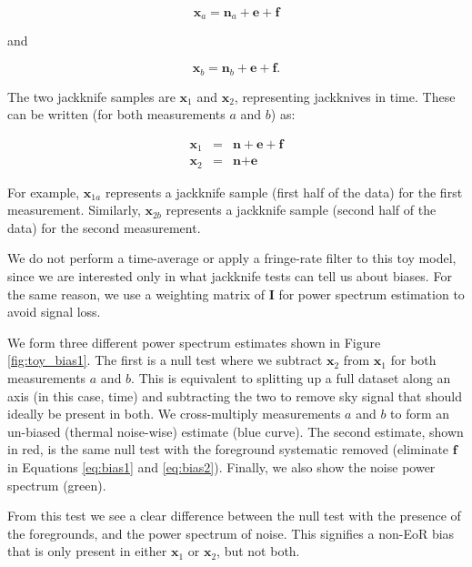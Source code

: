 \documentclass[preprint2,numberedappendix,tighten]{aastex6}  %
\begin{document}
\begin{equation}
\label{eq:bias1}
\textbf{x}_{a} = \textbf{n}_{a} + \textbf{e} + \textbf{f}
\end{equation} 

\noindent and 

\begin{equation}
\label{eq:bias2}
\textbf{x}_{b} = \textbf{n}_{b} + \textbf{e} + \textbf{f}.
\end{equation}

\noindent The two jackknife samples are $\textbf{x}_{1}$ and $\textbf{x}_{2}$, representing jackknives in time. These can be 
written (for both measurements $a$ and $b$) as:

\begin{eqnarray}
\textbf{x}_{1} &=& \textbf{n} + \textbf{e} + \textbf{f} \\
\textbf{x}_{2} &=& \textbf{n} + \textbf{e} 
\end{eqnarray}

\noindent For example, $\textbf{x}_{1a}$ represents a jackknife sample (first half of the data) for the first measurement. 
Similarly, $\textbf{x}_{2b}$ represents a jackknife sample (second half of the data) for the second measurement.

We do not perform a time-average or apply a fringe-rate filter to this toy model, since we are interested only in what jackknife 
tests can tell us about biases. For the same reason, we use a weighting matrix of $\textbf{I}$ for power spectrum estimation to 
avoid signal loss. 

We form three different power spectrum estimates shown in Figure \ref{fig:toy_bias1}. The first is a null test where we subtract $
\textbf{x}_{2}$ from $\textbf{x}_{1}$ for both measurements $a$ and $b$. This is equivalent to splitting up a full dataset along 
an axis (in this case, time) and subtracting the two to remove sky signal that should ideally be present in both. We cross-multiply measurements $a$ and $b$ to form an un-biased (thermal noise-wise) estimate (blue curve). The second estimate, 
shown in red, is the same null test with the foreground systematic removed (eliminate $\textbf{f}$ in Equations \ref{eq:bias1} 
and \ref{eq:bias2}). Finally, we also show the noise power spectrum (green).

From this test we see a clear difference between the null test with the presence of the foregrounds, and the power spectrum of 
noise. This signifies a non-EoR bias that is only present in either $\textbf{x}_{1}$ or $\textbf{x}_{2}$, but not both.
\end{document}
